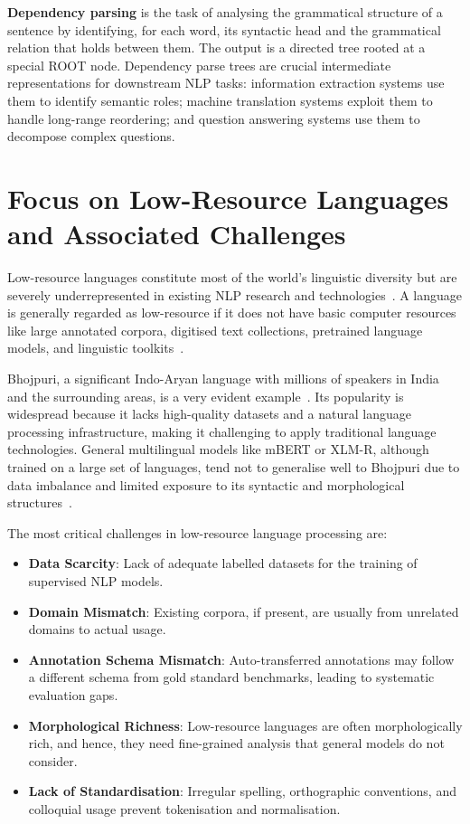 \documentclass[12pt,a4paper,oneside]{report}
\newcommand{\bho}{Bhojpuri}
\begin{document}
\textbf{Dependency parsing} is the task of analysing the grammatical structure of a
sentence by identifying, for each word, its syntactic head and the grammatical relation
that holds between them. The output is a directed tree rooted at a special ROOT node.
Dependency parse trees are crucial intermediate representations for downstream NLP
tasks: information extraction systems use them to identify semantic roles; machine
translation systems exploit them to handle long-range reordering; and question
answering systems use them to decompose complex questions.

\section{Focus on Low-Resource Languages and Associated Challenges}

Low-resource languages constitute most of the world's linguistic diversity but are
severely underrepresented in existing NLP research and technologies~\citep{joshi2020state}.
A language is generally regarded as low-resource if it does not have basic computer
resources like large annotated corpora, digitised text collections, pretrained language
models, and linguistic toolkits~\citep{kakwani2020indicnlpsuite}.

\bho{}, a significant Indo-Aryan language with millions of speakers in India and
the surrounding areas, is a very evident example~\citep{bhtb2022}. Its popularity is
widespread because it lacks high-quality datasets and a natural language processing
infrastructure, making it challenging to apply traditional language technologies.
General multilingual models like mBERT or XLM-R, although trained on a large set of
languages, tend not to generalise well to \bho{} due to data imbalance and limited
exposure to its syntactic and morphological structures~\citep{conneau2020xlmr}.

The most critical challenges in low-resource language processing are:
\begin{itemize}
  \item \textbf{Data Scarcity}: Lack of adequate labelled datasets for the training
        of supervised NLP models.
  \item \textbf{Domain Mismatch}: Existing corpora, if present, are usually from
        unrelated domains to actual usage.
  \item \textbf{Annotation Schema Mismatch}: Auto-transferred annotations may follow
        a different schema from gold standard benchmarks, leading to systematic
        evaluation gaps.
  \item \textbf{Morphological Richness}: Low-resource languages are often
        morphologically rich, and hence, they need fine-grained analysis that general
        models do not consider.
  \item \textbf{Lack of Standardisation}: Irregular spelling, orthographic
        conventions, and colloquial usage prevent tokenisation and normalisation.
\end{itemize}
\end{document}
